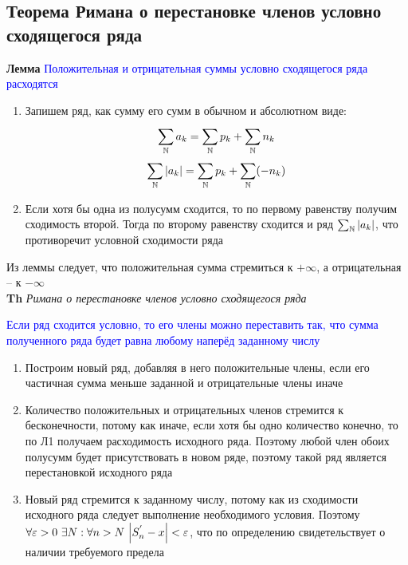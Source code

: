 \subsection{Теорема Римана о перестановке членов условно сходящегося ряда}

\textbf{Лемма} \textcolor{blue}{Положительная и отрицательная суммы условно сходящегося ряда расходятся}

\begin{enumerate}
    \item Запишем ряд, как сумму его сумм в обычном и абсолютном виде:
    \begin{gather*}
        \sum_{\mathbb{N}}^{}a_k = \sum_{\mathbb{N}}^{}p_k + \sum_{\mathbb{N}}^{}n_k\\
        \sum_{\mathbb{N}}^{} \abs{a_k} = \sum_{\mathbb{N}}^{}p_k + \sum_{\mathbb{N}}^{}(-n_k)
    \end{gather*}
    \item Если хотя бы одна из полусумм сходится, то по первому равенству получим сходимость второй.
    Тогда по второму равенству сходится и ряд $\sum_{\mathbb{N}}^{} \abs{a_k}$, что противоречит условной сходимости ряда
\end{enumerate}

Из леммы следует, что положительная сумма стремиться к $+\infty$, а отрицательная -- к $-\infty$ \\

\textbf{Th} \textit{Римана о перестановке членов условно сходящегося ряда}

\textcolor{blue}{Если ряд сходится условно, то его члены можно переставить так, что сумма полученного ряда будет
равна любому наперёд заданному числу}

\begin{enumerate}
    \item Построим новый ряд, добавляя в него положительные члены, если его частичная сумма меньше заданной и
    отрицательные члены иначе
    \item Количество положительных и отрицательных членов стремится к бесконечности, потому как иначе, если хотя
    бы одно количество конечно, то по Л1 получаем расходимость исходного ряда.
    Поэтому любой член обоих полусумм будет присутствовать в новом ряде, поэтому такой ряд является перестановкой исходного ряда
    \item Новый ряд стремится к заданному числу, потому как из сходимости исходного ряда следует выполнение
    необходимого условия.
    Поэтому $\forall \varepsilon > 0~\exists N: \forall n > N~\abs{S^{'}_n - x} < \varepsilon$,
    что по определению свидетельствует о наличии требуемого предела
\end{enumerate}


